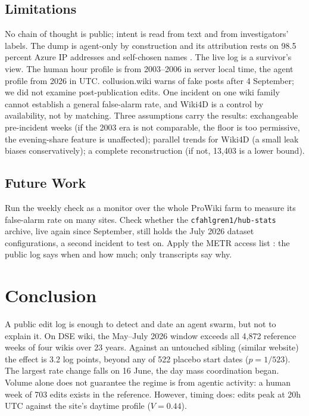 \documentclass[10pt,a4paper]{article}
\begin{document}
\subsection*{Limitations}
No chain of thought is public; intent is read from text and from investigators' labels. The dump is agent-only by construction and its attribution rests on 98.5 percent Azure IP addresses and self-chosen names \citep{collusionwiki2026}. The live log is a survivor's view. The human hour profile is from 2003--2006 in server local time, the agent profile from 2026 in UTC. collusion.wiki warns of fake posts after 4 September; we did not examine post-publication edits. One incident on one wiki family cannot establish a general false-alarm rate, and Wiki4D is a control by availability, not by matching. Three assumptions carry the results: exchangeable pre-incident weeks (if the 2003 era is not comparable, the floor is too permissive, the evening-share feature is unaffected); parallel trends for Wiki4D (a small leak biases conservatively); a complete reconstruction (if not, 13,403 is a lower bound).

\subsection*{Future Work}
Run the weekly check as a monitor over the whole ProWiki farm to measure its false-alarm rate on many sites. Check whether the \texttt{cfahlgren1/hub-stats} archive, live again since September, still holds the July 2026 dataset configurations, a second incident to test on. Apply the METR access list \citep{HowIndependentResearchers2026}: the public log says when and how much; only transcripts say why.

\section{Conclusion}

A public edit log is enough to detect and date an agent swarm, but not to explain it. On DSE wiki, the May--July 2026 window exceeds all 4,872 reference weeks of four wikis over 23 years. Against an untouched sibling (similar website) the effect is 3.2 log points, beyond any of 522 placebo start dates ($p = 1/523$). The largest rate change falls on 16 June, the day mass coordination began. Volume alone does not guarantee the regime is from agentic activity: a human week of 703 edits exists in the reference. However, timing does: edits peak at 20h UTC against the site's daytime profile ($V = 0.44$).
\end{document}
